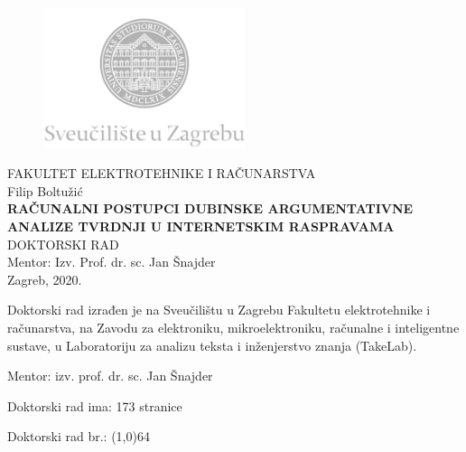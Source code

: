 \begin{titlepage}
  \fontsize{16pt}{20pt}\selectfont
  \selectfont
  \setlength{\intextsep}{0pt plus 0pt minus 0pt}

  \begin{center}
    \begin{figure}[ht!]
      \begin{center}
        \includegraphics[height=4.1184cm, width=5.94cm]{logo_unizg2}
      \end{center}
    \end{figure}		
    \vspace{0cm}
    {FAKULTET ELEKTROTEHNIKE I RAČUNARSTVA} \\
    \vspace{3cm}
    Filip Boltužić \\
    \vspace{2cm}
    {\fontsize{22pt}{22pt}\selectfont\textbf{
RAČUNALNI POSTUPCI DUBINSKE ARGUMENTATIVNE ANALIZE TVRDNJI U INTERNETSKIM RASPRAVAMA
}} \\
    \vspace{2cm}    
    DOKTORSKI RAD \\
    \vspace{5cm}    %
	Mentor: Izv. Prof. dr. sc. Jan Šnajder \\
    \vfill{Zagreb, 2020.}
  \end{center}
  \restoregeometry
\end{titlepage}


\begin{titlepage}
  \begin{minipage}{\dimexpr\textwidth-1cm}
    \vspace{3cm}
    Doktorski rad izrađen je na Sveučilištu u Zagrebu
    Fakultetu elektrotehnike i računarstva, na Zavodu za 
    elektroniku, mikroelektroniku, računalne i inteligentne sustave, u 
    Laboratoriju za analizu teksta i inženjerstvo znanja (TakeLab).

    \vspace{1cm}
    Mentor: izv. prof. dr. sc. Jan Šnajder

    \vspace{1cm}
    Doktorski rad ima: 173 stranice

    \vspace{1cm}
    Doktorski rad br.: \line(1,0){64}
  \end{minipage}
\end{titlepage}


